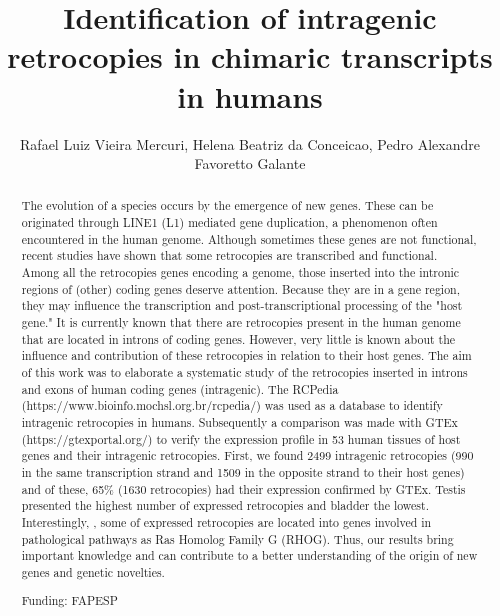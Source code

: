 \documentclass[twoside]{article}
\title{\vspace{-15mm}\fontsize{24pt}{10pt}\selectfont\textbf{ Identification of intragenic retrocopies in chimaric transcripts in humans }} %
\author{ Rafael Luiz Vieira Mercuri, Helena Beatriz da Conceicao, Pedro Alexandre Favoretto Galante }
\affil{ Instituto de Ensino e Pesquisa,  Hospital S\'{\i}rio-Liban\^es }
\date{}
\begin{document}
  
  
  \maketitle %
  
  
  \thispagestyle{fancy} %
  
  
  \begin{abstract}
  The evolution of a species occurs by the emergence of new genes. These can be originated through LINE1 (L1) mediated gene duplication,  a phenomenon often encountered in the human genome. Although sometimes these genes are not functional,  recent studies have shown that some retrocopies are transcribed and functional. Among all the retrocopies genes encoding a genome,  those inserted into the intronic regions of (other) coding genes deserve attention. Because they are in a gene region,  they may influence the transcription and post-transcriptional processing of the "host gene." It is currently known that there are retrocopies present in the human genome that are located in introns of coding genes. However,  very little is known about the influence and contribution of these retrocopies in relation to their host genes. The aim of this work was to elaborate a systematic study of the retrocopies inserted in introns and exons of human coding genes (intragenic). The RCPedia (https://www.bioinfo.mochsl.org.br/rcpedia/) was used as a database to identify intragenic retrocopies in humans. Subsequently a comparison was made with GTEx (https://gtexportal.org/) to verify the expression profile in 53 human tissues of host genes and their intragenic retrocopies. First,  we found 2499 intragenic retrocopies (990 in the same transcription strand and 1509 in the opposite strand to their host genes) and of these,  65\% (1630 retrocopies) had their expression confirmed by GTEx. Testis presented the highest number of expressed retrocopies and bladder the lowest. Interestingly,  ,  some of expressed retrocopies are located into genes involved in pathological pathways as Ras Homolog Family G (RHOG). Thus,  our results bring important knowledge and can contribute to a better understanding of the origin of new genes and genetic novelties.
  
  Funding: FAPESP \\ 
  \end{abstract}
  
\end{document}

